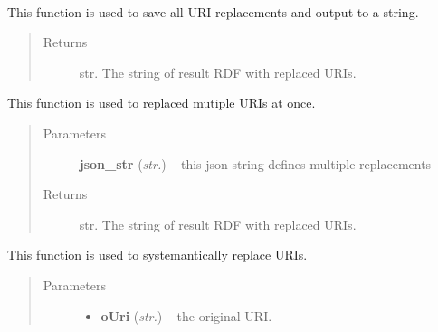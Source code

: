 \documentclass[letterpaper,10pt,english]{sphinxmanual}
\begin{document}
\begin{fulllineitems}
\label{api_ref:mapper.Mapper}~

\begin{fulllineitems}
\label{api_ref:mapper.Mapper.commit}
This function is used to save all URI replacements and output to a string.
\begin{quote}\begin{description}
\item[{Returns}] \leavevmode
str. The string of result RDF with replaced URIs.

\end{description}\end{quote}

\end{fulllineitems}


\begin{fulllineitems}
\label{api_ref:mapper.Mapper.mapping}
This function is used to replaced mutiple URIs at once.
\begin{quote}\begin{description}
\item[{Parameters}] \leavevmode
\textbf{json\_str} (\emph{str.}) -- this json string defines multiple replacements

\item[{Returns}] \leavevmode
str. The string of result RDF with replaced URIs.

\end{description}\end{quote}

\end{fulllineitems}


\begin{fulllineitems}
\label{api_ref:mapper.Mapper.replaceUri}
This function is used to systemantically replace URIs.
\begin{quote}\begin{description}
\item[{Parameters}] \leavevmode\begin{itemize}
\item {} 
\textbf{oUri} (\emph{str.}) -- the original URI.


\end{itemize}
\end{description}
\end{quote}
\end{fulllineitems}
\end{fulllineitems}
\end{document}
